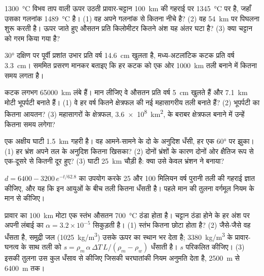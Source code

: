 \begin{exercise}[$\star\star$]\label{exo:g11:ocean-ridges:7}
\qty{1300}{\celsius} विभव ताप वाली ऊपर उठती प्रावार-चट्टान \qty{100}{km} की गहराई पर
\qty{1345}{\celsius} पर है, जहाँ उसका
गलनांक \qty{1489}{\celsius} है। (1) वह अपने गलनांक से
कितना नीचे है? (2) वह \qty{54}{km} पर पिघलना शुरू करती है। ऊपर जाते हुए
औसतन प्रति किलोमीटर कितने अंश यह अंतर घटा है? (3) क्या चट्टान को
गरम किया गया है?
\end{exercise}

\begin{exercise}[$\star\star$]\label{exo:g11:ocean-ridges:8}
\ang{30} दक्षिण पर पूर्वी प्रशांत उभार प्रति वर्ष \qty{14.6}{cm} खुलता है,
मध्य-अटलांटिक कटक प्रति वर्ष \qty{3.3}{cm}। सममित प्रसरण मानकर बताइए कि हर कटक को
एक ओर \qty{1000}{km} तली बनाने में कितना समय लगता है।
\end{exercise}

\begin{exercise}[$\star\star$]\label{exo:g11:ocean-ridges:9}
कटक लगभग \qty{65000}{km} लंबे हैं। मान लीजिए वे औसतन
प्रति वर्ष \qty{5}{cm} खुलते हैं और \qty{7.1}{km} मोटी भूपर्पटी बनाते हैं। (1) वे हर वर्ष
कितने क्षेत्रफल की नई महासागरीय तली बनाते हैं? (2) भूपर्पटी का कितना आयतन? (3) महासागरों के क्षेत्रफल,
\qty{3.6e8}{km^2}, के बराबर क्षेत्रफल बनाने में उन्हें कितना समय लगेगा?
\end{exercise}

\begin{exercise}[$\star\star$]\label{exo:g11:ocean-ridges:10}
एक अक्षीय घाटी \qty{1.5}{km} गहरी है। वह आमने-सामने के दो  के अनुदिश
धँसी, हर एक \ang{60} पर झुका। (1) हर भ्रंश
अपने तल के अनुदिश कितना खिसका? (2) दोनों भ्रंशों के कारण दोनों ओर क्षैतिज रूप से
एक-दूसरे से कितनी दूर हुए? (3) घाटी \qty{25}{km} चौड़ी है: क्या उसे
केवल भ्रंशन ने बनाया?
\end{exercise}

\begin{exercise}[$\star\star$]\label{exo:g11:ocean-ridges:11}
$d = 6400 - 3200\,e^{-t/62.8}$ का उपयोग करके 25 और 100
मिलियन वर्ष पुरानी तली की गहराई ज्ञात कीजिए, और यह कि इन आयुओं के बीच तली कितना धँसती है। पहले
मान की तुलना वर्गमूल नियम के मान से कीजिए।
\end{exercise}

\begin{exercise}[$\star\star\star$]\label{exo:g11:ocean-ridges:12}
प्रावार का \qty{100}{km} मोटा एक स्तंभ औसतन \qty{700}{\celsius}
ठंडा होता है। चट्टान ठंडा होने के हर अंश पर अपनी लंबाई का $\alpha = 3.2 \times 10^{-5}$
सिकुड़ती है। (1) स्तंभ कितना छोटा होता है? (2) जैसे-जैसे वह
धँसता है, समुद्री जल (\qty{1025}{kg/m^3}) उसके ऊपर का स्थान भर देता है; \qty{3380}{kg/m^3} के
प्रावार-घनत्व के साथ  तली को
$s = \rho_m\,\alpha\,\Delta T\,L/(\rho_m - \rho_w)$ धँसाती है। $s$ परिकलित कीजिए। (3) इसकी तुलना
उस कुल धँसाव से कीजिए जिसकी चरघातांकी नियम अनुमति देता है, \qty{2500}{m} से
\qty{6400}{m} तक।
\end{exercise}

